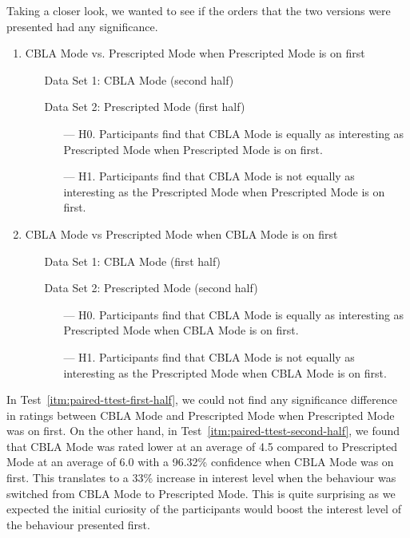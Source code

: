 Taking a closer look, we wanted to see if the orders that the two versions were presented had any significance. 

\begin{enumerate}[resume]
	\item CBLA Mode vs. Prescripted Mode when Prescripted Mode is on first
	\begin{itemize}[align=left]\label{itm:paired-ttest-first-half}
		\item[Data Set 1: ] CBLA Mode (second half)
		\item[Data Set 2: ] Prescripted Mode (first half)
		\begin{itemize}
			\item[--- H0.] Participants find that CBLA Mode is equally as interesting as Prescripted Mode when Prescripted Mode is on first.
			\item[--- H1.] Participants find that CBLA Mode is not equally as interesting as the Prescripted Mode when Prescripted Mode is on first.
		\end{itemize}
	\end{itemize}
	\item CBLA Mode vs Prescripted Mode when CBLA Mode is on first
	\begin{itemize}[align=left]\label{itm:paired-ttest-second-half}
		\item[Data Set 1: ]  CBLA Mode (first half) 
		\item[Data Set 2: ]  Prescripted Mode (second half) 
		\begin{itemize}
			\item[--- H0.] Participants find that CBLA Mode is equally as interesting as Prescripted Mode when CBLA Mode is on first.
			\item[--- H1.] Participants find that CBLA Mode is not equally as interesting as the Prescripted Mode when CBLA Mode is on first.
		\end{itemize}
	\end{itemize}
\end{enumerate}

In Test~\ref{itm:paired-ttest-first-half}, we could not find any significance difference in ratings between CBLA Mode and Prescripted Mode when Prescripted Mode was on first. On the other hand, in Test~\ref{itm:paired-ttest-second-half}, we found that CBLA Mode was rated lower at an average of 4.5 compared to Prescripted Mode at an average of 6.0 with a 96.32\% confidence when CBLA Mode was on first. This translates to a 33\% increase in interest level when the behaviour was switched from CBLA Mode to Prescripted Mode. This is quite surprising as we expected the initial curiosity of the participants would boost the interest level of the behaviour presented first.


